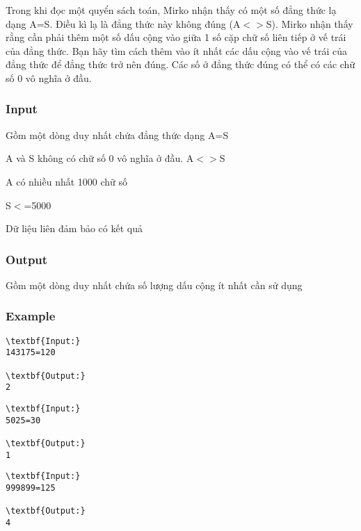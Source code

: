 







   Trong khi đọc một quyển sách toán, Mirko nhận thấy có một số đẳng thức lạ dạng A=S. Điều kì lạ là đẳng thức này không đúng (A$<$$>$S). Mirko nhận thấy rằng cần phải thêm một số dấu cộng vào giữa 1 số cặp chữ số liên tiếp ở vế trái của đẳng thức. Bạn hãy tìm cách thêm vào ít nhất các dấu cộng vào vế trái của đẳng thức để đẳng thức trở nên đúng. Các số ở đẳng thức đúng có thể có các chữ số 0 vô nghĩa ở đầu.  

\subsubsection{   Input  }

   Gồm một dòng duy nhất chứa đẳng thức dạng A=S  

   A và S không có chữ số 0 vô nghĩa ở đầu. A$<$$>$S  

   A có nhiều nhất 1000 chữ số  

   S$<$=5000  

   Dữ liệu liên đảm bảo có kết quả  

\subsubsection{   Output  }

   Gồm một dòng duy nhất chứa số lượng dấu cộng ít nhất cần sử dụng  

\subsubsection{   Example  }
\begin{verbatim}
\textbf{Input:}
143175=120

\textbf{Output:}
2
\end{verbatim}
\begin{verbatim}
\textbf{Input:}
5025=30

\textbf{Output:}
1
\end{verbatim}
\begin{verbatim}
\textbf{Input:}
999899=125

\textbf{Output:}
4
\end{verbatim}

